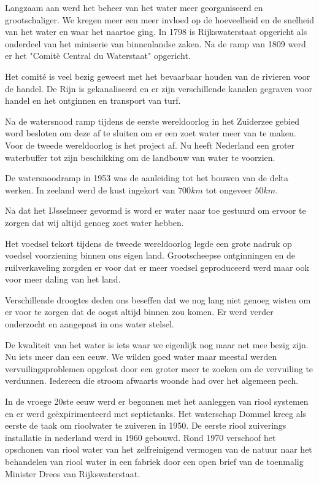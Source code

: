 Langzaam aan werd het beheer van het water meer georganiseerd en grootschaliger.
We kregen meer een meer invloed op de hoeveelheid en de snelheid van het water en waar het naartoe ging.
In 1798 is Rijkswaterstaat opgericht als onderdeel van het miniserie van binnenlandse zaken.
Na de ramp van 1809 werd er het "Comit\`e Central du Waterstaat" opgericht.

Het comité is veel bezig geweest met het bevaarbaar houden van de rivieren voor de handel.
De Rijn is gekanaliseerd en er zijn verschillende kanalen gegraven voor handel en het ontginnen en transport van turf.


Na de watersnood ramp tijdens de eerste wereldoorlog in het Zuiderzee gebied word besloten om deze af te sluiten om er een zoet water meer van te maken.
Voor de tweede wereldoorlog is het project af.
Nu heeft Nederland een groter waterbuffer tot zijn beschikking om de landbouw van water te voorzien.

De watersnoodramp in 1953 was de aanleiding tot het bouwen van de delta werken.
In zeeland werd de kust ingekort van $700 km$ tot ongeveer $50 km$.


Na dat het IJsselmeer gevormd is word er water naar toe gestuurd om ervoor te zorgen dat wij altijd genoeg zoet water hebben.

Het voedsel tekort tijdens de tweede wereldoorlog legde een grote nadruk op voedsel voorziening binnen ons eigen land.
Grootscheepse ontginningen en de ruilverkaveling zorgden er voor dat er meer voedsel geproduceerd werd maar ook voor meer daling van het land.

Verschillende droogtes deden ons beseffen dat we nog lang niet genoeg wisten om er voor te zorgen dat de oogst altijd binnen zou komen.
Er werd verder onderzocht en aangepast in ons water stelsel.

De kwaliteit van het water is iets waar we eigenlijk nog maar net mee bezig zijn.
Nu iets meer dan een eeuw.
We wilden goed water maar meestal werden vervuilingsproblemen opgelost door een groter meer te zoeken om de vervuiling te verdunnen.
Iedereen die stroom afwaarts woonde had over het algemeen pech.

In de vroege 20ste eeuw werd er begonnen met het aanleggen van riool systemen en er werd ge\"expirimenteerd met septictanks.
Het waterschap Dommel kreeg als eerste de taak om rioolwater te zuiveren in 1950.
De eerste riool zuiverings installatie in nederland werd in 1960 gebouwd.
Rond 1970 verschoof het opschonen van riool water van het zelfreinigend vermogen van de natuur naar het behandelen van riool water in een fabriek door een open brief van de toenmalig Minister Drees van Rijkswaterstaat.

